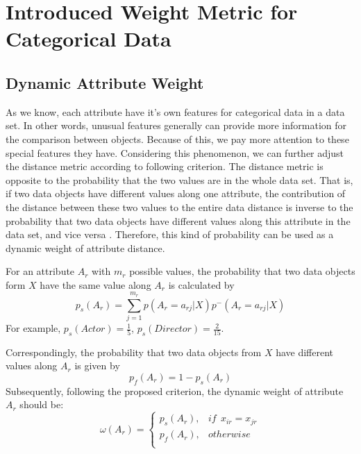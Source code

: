 \documentclass[review]{elsarticle}
\begin{document}
\section{Introduced  Weight Metric for Categorical Data}
\subsection{Dynamic Attribute Weight}
As we know, each attribute have it's own features for categorical data in a data set. In other words, unusual features generally can provide more information for the comparison between objects. Because of this, we pay more attention to these special features they have. Considering this phenomenon, we can further adjust the distance metric according to following criterion. The distance metric is opposite to the probability that the two values are in the whole data set. That is, if two data objects have different values along one attribute, the contribution of the distance between these two values to the entire data distance is inverse to the probability that two data objects have different values along this attribute in the data set, and vice versa \cite{JiaH2016NewMetric}. Therefore, this kind of probability can be used as a dynamic weight of attribute distance.

For an attribute $A_r$ with $m_r$ possible values, the probability that two data objects form $X$ have the same value along $A_r$ is calculated by
\begin{equation}
p_s(A_r) = \sum_{j=1}^{m_r}p(A_r = a_{rj}|X)p^-(A_r = a_{rj}|X)
\label{equ4}
\end{equation}
For example, $p_s(Actor) = \frac{1}{5}$, $p_s(Director) = \frac{2}{15}$.

Correspondingly, the probability that two data objects from $X$ have different values along $A_r$ is given by
\begin{equation}
p_f(A_r) = 1 - p_s(A_r)
\label{equ5}
\end{equation}
Subsequently, following the proposed criterion, the dynamic weight of attribute $A_r$ should be:
\begin{equation}
\label{equ6}
\omega(A_r)=
\left\{\begin{array}{cc}
  p_s(A_r), & if\ \ x_{ir} = x_{jr} \\
  p_f(A_r), & otherwise \\
  \end{array} \right.
\end{equation}
\end{document}
